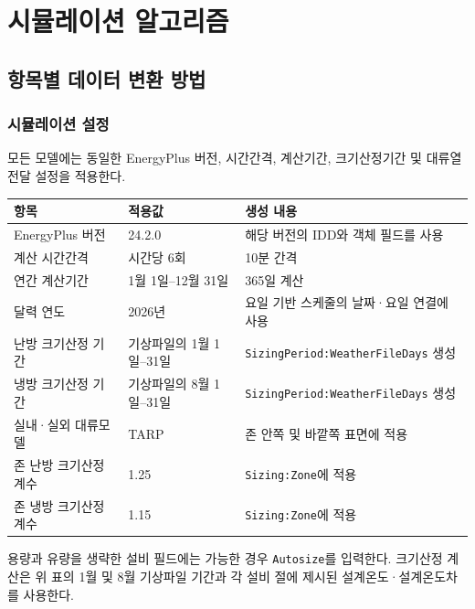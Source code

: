 
\part{시뮬레이션 알고리즘}
\label{part:algorithm}

\chapter{항목별 데이터 변환 방법}
\label{chap:simulator_geometry}

\section{시뮬레이션 설정}
\label{section:global-model-assumptions}

모든 모델에는 동일한 EnergyPlus 버전, 시간간격, 계산기간, 크기산정기간 및 대류열전달 설정을 적용한다.

\begin{defaulttable}
  \caption{모든 모델에 공통으로 적용되는 EnergyPlus 계산 설정}
  \label{tab:global-energyplus-settings}
  \small
  \begin{tabularx}{\textwidth}{p{4cm}p{4.1cm}X}
    \toprule
    항목 & 적용값 & 생성 내용 \\ \midrule
    EnergyPlus 버전 & 24.2.0 & 해당 버전의 IDD와 객체 필드를 사용 \\
    계산 시간간격 & 시간당 6회 & 10분 간격 \\
    연간 계산기간 & 1월 1일--12월 31일 & 365일 계산 \\
    달력 연도 & 2026년 & 요일 기반 스케줄의 날짜·요일 연결에 사용 \\
    난방 크기산정 기간 & 기상파일의 1월 1일--31일 & \texttt{SizingPeriod:WeatherFileDays} 생성 \\
    냉방 크기산정 기간 & 기상파일의 8월 1일--31일 & \texttt{SizingPeriod:WeatherFileDays} 생성 \\
    실내·실외 대류모델 & TARP & 존 안쪽 및 바깥쪽 표면에 적용 \\
    존 난방 크기산정 계수 & 1.25 & \texttt{Sizing:Zone}에 적용 \\
    존 냉방 크기산정 계수 & 1.15 & \texttt{Sizing:Zone}에 적용 \\ \bottomrule
  \end{tabularx}
\end{defaulttable}

용량과 유량을 생략한 설비 필드에는 가능한 경우 \texttt{Autosize}를 입력한다. 크기산정 계산은 위 표의 1월 및 8월 기상파일 기간과 각 설비 절에 제시된 설계온도·설계온도차를 사용한다.


